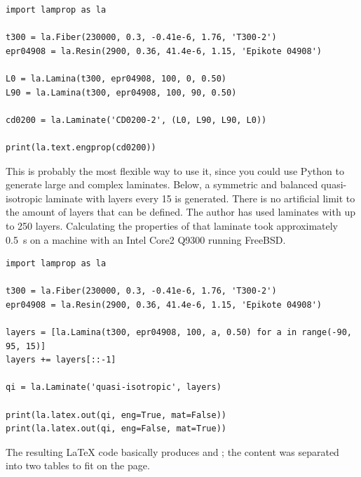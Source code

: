 \documentclass[a4paper,landscape,oneside,11pt,twocolumn]{memoir}
\begin{document}
\begin{lstlisting}
import lamprop as la

t300 = la.Fiber(230000, 0.3, -0.41e-6, 1.76, 'T300-2')
epr04908 = la.Resin(2900, 0.36, 41.4e-6, 1.15, 'Epikote 04908')

L0 = la.Lamina(t300, epr04908, 100, 0, 0.50)
L90 = la.Lamina(t300, epr04908, 100, 90, 0.50)

cd0200 = la.Laminate('CD0200-2', (L0, L90, L90, L0))

print(la.text.engprop(cd0200))
\end{lstlisting}

This is probably the most flexible way to use it, since you could use Python
to generate large and complex laminates. Below, a symmetric and balanced
quasi-isotropic laminate with layers every 15\textdegree{} is generated. There
is no artificial limit to the amount of layers that can be defined. The author
has used laminates with up to 250 layers. Calculating the properties of that
laminate took approximately \SI{0.5}{s} on a machine with an Intel Core2 Q9300
running FreeBSD.

\begin{lstlisting}
import lamprop as la

t300 = la.Fiber(230000, 0.3, -0.41e-6, 1.76, 'T300-2')
epr04908 = la.Resin(2900, 0.36, 41.4e-6, 1.15, 'Epikote 04908')

layers = [la.Lamina(t300, epr04908, 100, a, 0.50) for a in range(-90, 95, 15)]
layers += layers[::-1]

qi = la.Laminate('quasi-isotropic', layers)

print(la.latex.out(qi, eng=True, mat=False))
print(la.latex.out(qi, eng=False, mat=True))
\end{lstlisting}

The resulting \LaTeX{} code basically produces  and
; the content was separated into two tables to
fit on the page.
\clearpage
\end{document}
